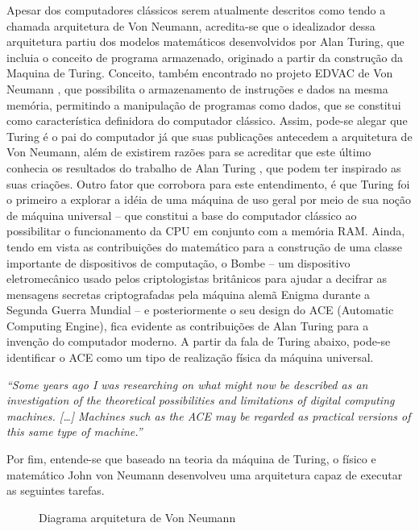 Apesar dos computadores clássicos serem atualmente descritos como tendo a chamada arquitetura de Von Neumann, acredita-se que o idealizador dessa arquitetura partiu dos modelos matemáticos desenvolvidos por Alan Turing, que incluia o conceito de programa armazenado, originado a partir da construção da Maquina de Turing. Conceito, também encontrado no projeto EDVAC de Von Neumann \cite{9}, que possibilita o armazenamento de instruções e dados na mesma memória, permitindo a manipulação de programas como dados, que se constitui como característica definidora do computador clássico. Assim, pode-se alegar que Turing é o pai do computador já que suas publicações antecedem a arquitetura de Von Neumann, além de existirem razões para se acreditar que este último conhecia os resultados do trabalho de Alan Turing \cite{10}, que podem ter inspirado as suas criações. Outro fator que corrobora para este entendimento, é que Turing foi o primeiro a explorar a idéia de uma máquina de uso geral por meio de sua noção de máquina universal – que constitui a base do computador clássico ao possibilitar o funcionamento da CPU em conjunto com a memória RAM. Ainda, tendo em vista as contribuições do matemático para a construção de uma classe importante de dispositivos de computação, o Bombe – um dispositivo eletromecânico usado pelos criptologistas britânicos para ajudar a decifrar as mensagens secretas criptografadas pela máquina alemã Enigma durante a Segunda Guerra Mundial – e posteriormente o seu design do ACE (Automatic Computing Engine), fica evidente as contribuições de Alan Turing para a invenção do computador moderno. A partir da fala de Turing abaixo, pode-se identificar o ACE como um tipo de realização física da máquina universal.

\textit{
  ``Some years ago I was researching on what might now be described as an investigation of the theoretical possibilities and limitations of digital computing machines. […] Machines such as the ACE may be regarded as practical versions of this same type of machine.'' \cite{11}
}

Por fim, entende-se que baseado na teoria da máquina de Turing, o físico e matemático John von Neumann desenvolveu uma arquitetura capaz de executar as seguintes tarefas.

\vspace{1cm}
\begin{figure}[H] \centering 
  \caption{\label{fig:2} Diagrama arquitetura de Von Neumann} 
\end{figure}

